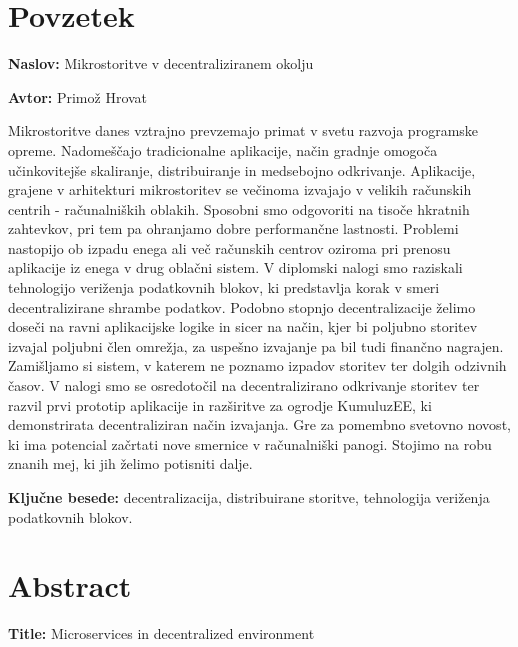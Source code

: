 \documentclass[a4paper, 12pt]{book}
\newcommand{\ttitle}{Mikrostoritve v decentraliziranem okolju}
\newcommand{\ttitleEn}{Microservices in decentralized environment}
\newcommand{\tauthor}{Primož Hrovat}
\newcommand{\tkeywords}{decentralizacija, distribuirane storitve, tehnologija veriženja podatkovnih blokov}
\newcommand{\clearemptydoublepage}{\newpage{\pagestyle{empty}\cleardoublepage}}
\begin{document}
\clearemptydoublepage

\chapter*{Povzetek}

\noindent\textbf{Naslov:} \ttitle
\bigskip

\noindent\textbf{Avtor:} \tauthor
\bigskip

\noindent

Mikrostoritve danes vztrajno prevzemajo primat v svetu razvoja programske opreme.
Nadomeščajo tradicionalne aplikacije, način gradnje omogoča učinkovitejše skaliranje, distribuiranje in medsebojno odkrivanje.
Aplikacije, grajene v arhitekturi mikrostoritev se večinoma izvajajo v velikih računskih centrih - računalniških oblakih.
Sposobni smo odgovoriti na tisoče hkratnih zahtevkov, pri tem pa ohranjamo dobre performančne lastnosti.
Problemi nastopijo ob izpadu enega ali več računskih centrov oziroma pri prenosu aplikacije iz enega v drug oblačni sistem.
V diplomski nalogi smo raziskali tehnologijo veriženja podatkovnih blokov, ki predstavlja korak v smeri decentralizirane shrambe podatkov.
Podobno stopnjo decentralizacije želimo doseči na ravni aplikacijske logike in sicer na način, kjer bi poljubno storitev izvajal poljubni člen omrežja, za uspešno izvajanje pa bil tudi finančno nagrajen.
Zamišljamo si sistem, v katerem ne poznamo izpadov storitev ter dolgih odzivnih časov.
V nalogi smo se osredotočil na decentralizirano odkrivanje storitev ter razvil prvi prototip aplikacije in razširitve za ogrodje KumuluzEE, ki demonstrirata decentraliziran način izvajanja.
Gre za pomembno svetovno novost, ki ima potencial začrtati nove smernice v računalniški panogi.
Stojimo na robu znanih mej, ki jih želimo potisniti dalje.

\bigskip

\noindent\textbf{Ključne besede:} \tkeywords.
\clearemptydoublepage

\chapter*{Abstract}

\noindent\textbf{Title:} \ttitleEn
\bigskip
\end{document}
